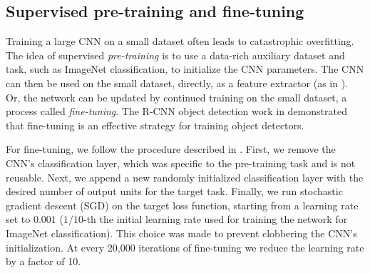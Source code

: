 \subsection{Supervised pre-training and fine-tuning}
\label{sub:fine-train}
Training a large CNN on a small dataset often leads to catastrophic overfitting.
The idea of supervised \emph{pre-training} is to use a data-rich auxiliary dataset and task, such as ImageNet classification, to initialize the CNN parameters. 
The CNN can then be used on the small dataset, directly, as a feature extractor (as in \cite{Decaf}).
Or, the network can be updated by continued training on the small dataset, a process called \emph{fine-tuning}.
The R-CNN object detection work in \cite{Rcnn} demonstrated that fine-tuning is an effective strategy for training object detectors.


For fine-tuning, we follow the procedure described in \cite{Rcnn}.
First, we remove the CNN's classification layer, which was specific to the pre-training task and is not reusable.
Next, we append a new randomly initialized classification layer with the desired number of output units for the target task.
Finally, we run stochastic gradient descent (SGD) on the target loss function, starting from a learning rate set to $0.001$ ($1/10$-th the initial learning rate used for training the network for ImageNet classification). 
This choice was made to prevent clobbering the CNN's initialization.
At every 20,000 iterations of fine-tuning we reduce the learning rate by a factor of 10.

